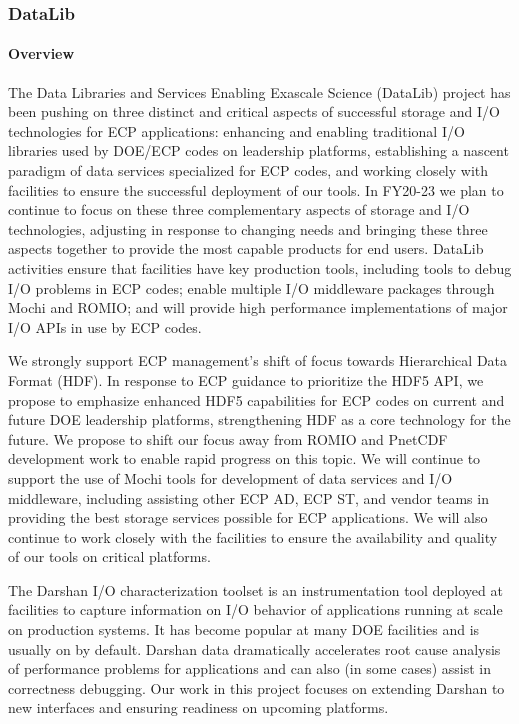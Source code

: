 \subsubsection{ DataLib} 

\paragraph{Overview} 

The Data Libraries and Services Enabling Exascale Science (DataLib)
project has been pushing on three distinct and critical
aspects of successful storage and I/O technologies for ECP applications:
enhancing and enabling traditional I/O libraries used by DOE/ECP
codes on leadership platforms, establishing a nascent paradigm of data
services specialized for ECP codes, and working closely with facilities
to ensure the successful deployment of our tools. In FY20-23 we plan to
continue to focus on these three complementary aspects of storage and
I/O technologies, adjusting in response to changing needs and bringing
these three aspects together to provide the most capable products for
end users. DataLib activities ensure that facilities have key production
tools, including tools to debug I/O problems in ECP codes; enable multiple
I/O middleware packages through Mochi and ROMIO; and will provide high
performance implementations of major I/O APIs in use by ECP codes.

We strongly support ECP management’s shift of focus towards
Hierarchical Data Format (HDF). In response to ECP guidance
to prioritize the HDF5 API, we propose to emphasize enhanced HDF5
capabilities for ECP codes on current and future DOE leadership
platforms, strengthening HDF as a core technology for the future. We
propose to shift our focus away from ROMIO and PnetCDF development work
to enable rapid progress on this topic. We will continue to support the
use of Mochi tools for development of data services and I/O middleware,
including assisting other ECP AD, ECP ST, and vendor teams in providing
the best storage services possible for ECP applications. We will also
continue to work closely with the facilities to ensure the availability
and quality of our tools on critical platforms.

The Darshan I/O characterization toolset is an instrumentation tool
deployed at facilities to capture information on I/O behavior of
applications running at scale on production systems. It has become
popular at many DOE facilities and is usually on by default. Darshan
data dramatically accelerates root cause analysis of performance
problems for applications and can also (in some cases) assist in
correctness debugging. Our work in this project focuses on extending
Darshan to new interfaces and ensuring readiness on upcoming
platforms.

